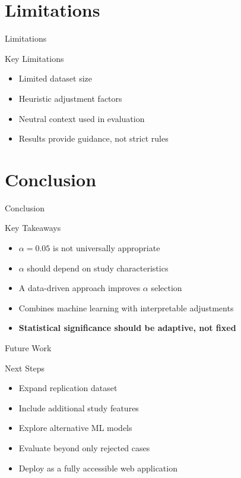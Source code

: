 \section{Limitations}
\begin{frame}{Limitations}
	
	\begin{block}{Key Limitations}
		\begin{itemize}
			\item Limited dataset size
			\item Heuristic adjustment factors
			\item Neutral context used in evaluation
			\item Results provide guidance, not strict rules
		\end{itemize}
	\end{block}
	
\end{frame}
\section{Conclusion}
\begin{frame}{Conclusion}
	
	\begin{block}{Key Takeaways}
		\begin{itemize}
			\item $\alpha = 0.05$ is not universally appropriate
			\item $\alpha$ should depend on study characteristics
			\item A data-driven approach improves $\alpha$ selection
			\item Combines machine learning with interpretable adjustments
			\item \textbf{Statistical significance should be adaptive, not fixed}
		\end{itemize}
	\end{block}
	
\end{frame}

\begin{frame}{Future Work}
	
	\begin{block}{Next Steps}
		\begin{itemize}
			\item Expand replication dataset  
			\item Include additional study features 
			\item Explore alternative ML models
			\item Evaluate beyond only rejected cases
			\item Deploy as a fully accessible web application
		\end{itemize}
	\end{block}
	
\end{frame}
